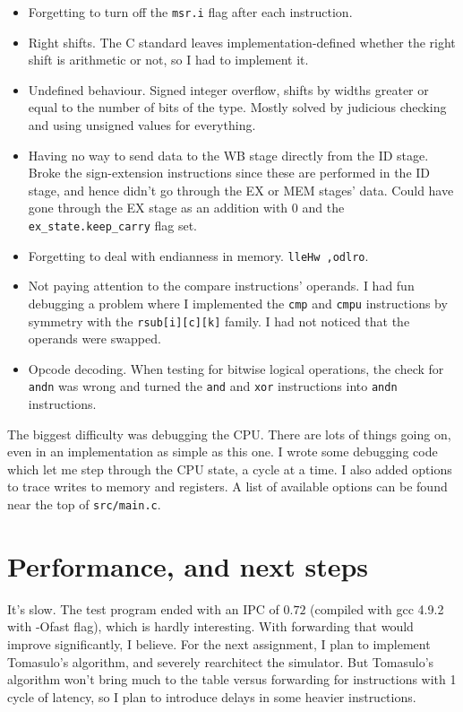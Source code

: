 \documentclass[]{IEEEtran}
\begin{document}
\begin{itemize}
\item Forgetting to turn off the \verb|msr.i| flag after each instruction.
\item Right shifts. The C standard leaves implementation-defined whether the
right shift is arithmetic or not, so I had to implement it.
\item Undefined behaviour. Signed integer overflow, shifts by widths greater or
equal to the number of bits of the type. Mostly solved by judicious checking and
using unsigned values for everything.
\item Having no way to send data to the WB stage directly from the ID stage.
Broke the sign-extension instructions since these are performed in the ID stage,
and hence didn't go through the EX or MEM stages' data. Could have gone through
the EX stage as an addition with 0 and the \verb|ex_state.keep_carry| flag set.
\item Forgetting to deal with endianness in memory. \verb|lleHw ,odlro|.
\item Not paying attention to the compare instructions' operands. I had fun
debugging a problem where I implemented the \verb|cmp| and \verb|cmpu|
instructions by symmetry with the \verb|rsub[i][c][k]| family. I had not noticed
that the operands were swapped.
\item Opcode decoding. When testing for bitwise logical operations, the check
for \verb|andn| was wrong and turned the \verb|and| and \verb|xor| instructions
into \verb|andn| instructions.
\end{itemize}

The biggest difficulty was debugging the CPU. There are lots of things going on,
even in an implementation as simple as this one. I wrote some debugging code
which let me step through the CPU state, a cycle at a time. I also added options
to trace writes to memory and registers. A list of available options can be
found near the top of \verb|src/main.c|.


\section{Performance, and next steps}

It's slow. The test program ended with an IPC of $0.72$ (compiled with gcc 4.9.2
with -Ofast flag), which is hardly interesting. With forwarding that would
improve significantly, I believe. For the next assignment, I plan to implement
Tomasulo's algorithm, and severely rearchitect the simulator. But Tomasulo's
algorithm won't bring much to the table versus forwarding for instructions with
1 cycle of latency, so I plan to introduce delays in some heavier instructions.
\end{document}
